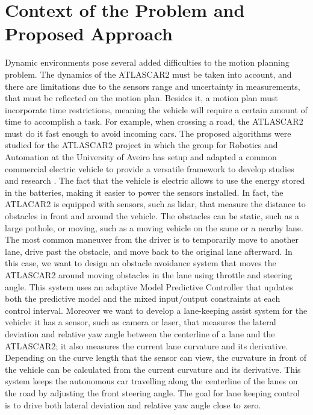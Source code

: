 \section{Context of the Problem and Proposed Approach}\label{sec:context}
Dynamic environments pose several added difficulties to the motion planning problem. The dynamics of the ATLASCAR2 must be taken into account, and there are limitations due to the sensors range and uncertainty in measurements, that must be reflected on the motion plan. Besides it, a motion plan must incorporate time restrictions, meaning the vehicle will require a certain amount of time to accomplish a task. For example, when crossing a road, the ATLASCAR2 must do it fast enough to avoid incoming cars. The proposed algorithms were studied for the ATLASCAR2 project in which the group for Robotics and Automation at the University of Aveiro has setup and adapted a common commercial electric vehicle to provide a versatile  framework  to  develop  studies  and  research \cite{vsantos2010} \cite{vsantos2019}. The fact that the vehicle is electric allows to use the energy stored in the batteries, making it easier to power the sensors installed. In fact, the ATLACAR2 is equipped with sensors, such as lidar, that measure the distance to obstacles in front and around the vehicle. The obstacles can be static, such as a large pothole, or moving, such as a moving vehicle on the same or a nearby lane. The most common maneuver from the driver is to temporarily move to another lane, drive past the obstacle, and move back to the original lane afterward. In this case, we want to design an obstacle avoidance system that moves the ATLASCAR2 around  moving obstacles in the lane using throttle and steering angle. This system uses an adaptive Model Predictive Controller that updates both the predictive model and the mixed input/output constraints at each control interval. Moreover we want to develop a lane-keeping assist system for the vehicle: it has a sensor, such as camera or laser, that measures the lateral deviation and relative yaw angle between the centerline of a lane and the ATLASCAR2; it also measures the current lane curvature and its derivative. Depending on the curve length that the sensor can view, the curvature in front of the vehicle can be calculated from the current curvature and its derivative. This system keeps the autonomous car travelling along the centerline of the lanes on the road by adjusting the front steering angle. The goal for lane keeping control is to drive both lateral deviation and relative yaw angle close to zero.

